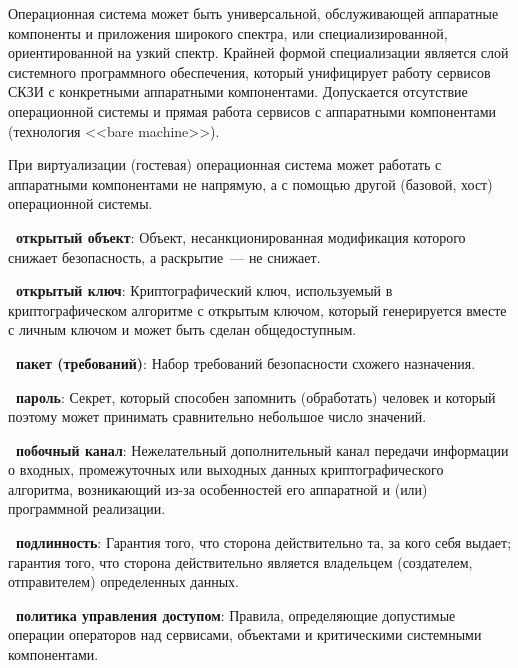 \begin{note}
Операционная система может быть универсальной, обслуживающей аппаратные 
компоненты и приложения широкого спектра, или специализированной, 
ориентированной на узкий спектр. Крайней формой специализации является
слой системного программного обеспечения, который унифицирует работу
сервисов СКЗИ с конкретными аппаратными компонентами. Допускается отсутствие 
операционной системы и прямая работа сервисов с аппаратными компонентами
(технология <<bare machine>>).
\end{note}

\begin{note}
При виртуализации (гостевая) операционная система может работать с
аппаратными компонентами не напрямую, а с помощью другой 
(базовой, хост) операционной системы.
\end{note}

{\bf \thedefctr~открытый объект}: 
Объект, несанкционированная модификация которого снижает безопасность, а
раскрытие~--- не снижает.

{\bf \thedefctr~открытый ключ}:
Криптографический ключ, используемый в криптографическом алгоритме 
с открытым ключом, который генерируется вместе с личным ключом и может 
быть сделан общедоступным.


{\bf \thedefctr~пакет (требований)}:
Набор требований безопасности схожего назначения.

{\bf \thedefctr~пароль}:
Секрет, который способен запомнить (обработать) человек и который
поэтому может принимать сравнительно небольшое число значений.

{\bf \thedefctr~побочный канал}:
Нежелательный дополнительный канал передачи информации о 
входных, промежуточных или выходных данных криптографического алгоритма,  
возникающий из-за особенностей его аппаратной и (или) программной реализации.

{\bf \thedefctr~подлинность}:
Гарантия того, что сторона действительно та, за кого себя выдает; гарантия того,
что сторона действительно является владельцем (создателем, отправителем)
определенных данных.

{\bf \thedefctr~политика управления доступом}:
Правила, определяющие допустимые операции операторов над сервисами, объектами и
критическими системными компонентами.

